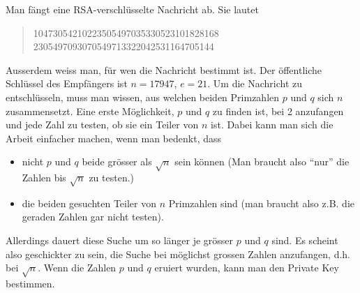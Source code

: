 \documentclass[%
<<<<<<< Updated upstream
11pt,%
twoside,%
titlepage,%
german,%
headsepline%
]{scrartcl}
\begin{document}
\begin{bsp}
Man fängt eine RSA-verschlüsselte Nachricht ab. Sie lautet

\begin{quote}
10473054210223505497035330523101828168\\
2305497093070549713322042531164705144
\end{quote}

Ausserdem weiss man, für wen die Nachricht bestimmt ist. Der öffentliche Schlüssel des Empfängers ist
$n=17947$, $e=21$.
Um die Nachricht zu entschlüsseln, muss man wissen, aus welchen beiden Primzahlen $p$ und $q$ sich $n$ zusammensetzt.
Eine erste Möglichkeit, $p$ und $q$ zu finden ist, bei 2 anzufangen und jede Zahl zu testen, ob sie ein Teiler von $n$ ist. Dabei kann man sich die Arbeit einfacher machen, wenn man bedenkt, dass

\begin{itemize}
\item nicht $p$ und $q$ beide grösser als $\sqrt{n}$ sein können (Man braucht also \enquote{nur} die Zahlen bis $\sqrt{n}$ zu testen.)
\item die beiden gesuchten Teiler von $n$ Primzahlen sind (man braucht also z.B. die geraden Zahlen gar nicht testen).
\end{itemize}

Allerdings dauert diese Suche um so länger je grösser $p$ und $q$  sind. Es scheint also geschickter zu sein, die Suche bei möglichst grossen Zahlen anzufangen, d.h. bei $\sqrt{n}$.
Wenn die Zahlen $p$ und $q$ eruiert wurden, kann man den Private Key bestimmen.
\end{bsp}
\end{document}
